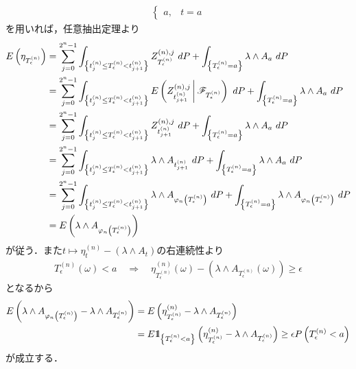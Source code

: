 \begin{prf}
\begin{description}
\begin{align}
\begin{cases}
						a, & t = a
					\end{cases}
				\end{align}
				を用いれば，任意抽出定理より
				\begin{align}
					E\left( \eta_{T^{(n)}_\epsilon} \right)
					&= \sum_{j=0}^{2^n-1} \int_{\left\{t^{(n)}_j \leq T^{(n)}_\epsilon < t^{(n)}_{j+1}\right\}} Z^{(n),j}_{T^{(n)}_\epsilon}\ dP
						+ \int_{\left\{T^{(n)}_\epsilon = a\right\}} \lambda \wedge A_a\ dP \\
					&= \sum_{j=0}^{2^n-1} \int_{\left\{t^{(n)}_j \leq T^{(n)}_\epsilon < t^{(n)}_{j+1}\right\}} E\left( Z^{(n),j}_{t^{(n)}_{j+1}} \, \middle|\, \mathscr{F}_{T^{(n)}_\epsilon} \right)\ dP
						+ \int_{\left\{T^{(n)}_\epsilon = a\right\}} \lambda \wedge A_a\ dP \\
					&= \sum_{j=0}^{2^n-1} \int_{\left\{t^{(n)}_j \leq T^{(n)}_\epsilon < t^{(n)}_{j+1}\right\}} Z^{(n),j}_{t^{(n)}_{j+1}}\ dP
						+ \int_{\left\{T^{(n)}_\epsilon = a\right\}} \lambda \wedge A_a\ dP \\
					&= \sum_{j=0}^{2^n-1} \int_{\left\{t^{(n)}_j \leq T^{(n)}_\epsilon < t^{(n)}_{j+1}\right\}} \lambda \wedge A_{t^{(n)}_{j+1}}\ dP
						+ \int_{\left\{T^{(n)}_\epsilon = a\right\}} \lambda \wedge A_a\ dP \\
					&= \sum_{j=0}^{2^n-1} \int_{\left\{t^{(n)}_j \leq T^{(n)}_\epsilon < t^{(n)}_{j+1}\right\}} \lambda \wedge A_{\varphi_n\left(T^{(n)}_\epsilon\right)}\ dP
						+ \int_{\left\{T^{(n)}_\epsilon = a\right\}} \lambda \wedge A_{\varphi_n\left(T^{(n)}_\epsilon\right)}\ dP \\
					&= E\left(\lambda \wedge A_{\varphi_n\left(T^{(n)}_\epsilon\right)}\right)
				\end{align}
				が従う．また$t \longmapsto \eta^{(n)}_t - (\lambda \wedge A_t)$の右連続性より
				\begin{align}
					T^{(n)}_\epsilon(\omega) < a
					\quad \Longrightarrow
					\quad \eta^{(n)}_{T^{(n)}_\epsilon}(\omega) - \left(\lambda \wedge A_{T^{(n)}_\epsilon}(\omega)\right)
						\geq \epsilon
				\end{align}
				となるから
				\begin{align}
					E\left(\lambda \wedge A_{\varphi_n\left(T^{(n)}_\epsilon\right)}
						- \lambda \wedge A_{T^{(n)}_\epsilon} \right)
					&= E\left(\eta^{(n)}_{T^{(n)}_\epsilon}
						- \lambda \wedge A_{T^{(n)}_\epsilon} \right) \\
					&= E\mbox{1}\hspace{-0.25em}\mbox{l}_{\left\{T^{(n)}_\epsilon < a\right\}}\left(\eta^{(n)}_{T^{(n)}_\epsilon}
						- \lambda \wedge A_{T^{(n)}_\epsilon} \right)
					\geq \epsilon P\left(T^{(n)}_\epsilon < a\right)
					\label{eq:chapter_1_theorem_4_14_5}
				\end{align}
				が成立する．
				

\end{description}
\end{prf}
